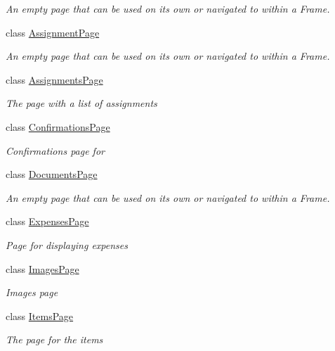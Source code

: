\begin{DoxyCompactItemize}
\begin{DoxyCompactList}\small\item\em An empty page that can be used on its own or navigated to within a Frame. \end{DoxyCompactList}\item 
class \hyperlink{class_field_service_1_1_win_r_t_1_1_views_1_1_assignment_page}{Assignment\+Page}
\begin{DoxyCompactList}\small\item\em An empty page that can be used on its own or navigated to within a Frame. \end{DoxyCompactList}\item 
class \hyperlink{class_field_service_1_1_win_r_t_1_1_views_1_1_assignments_page}{Assignments\+Page}
\begin{DoxyCompactList}\small\item\em The page with a list of assignments \end{DoxyCompactList}\item 
class \hyperlink{class_field_service_1_1_win_r_t_1_1_views_1_1_confirmations_page}{Confirmations\+Page}
\begin{DoxyCompactList}\small\item\em Confirmations page for \end{DoxyCompactList}\item 
class \hyperlink{class_field_service_1_1_win_r_t_1_1_views_1_1_documents_page}{Documents\+Page}
\begin{DoxyCompactList}\small\item\em An empty page that can be used on its own or navigated to within a Frame. \end{DoxyCompactList}\item 
class \hyperlink{class_field_service_1_1_win_r_t_1_1_views_1_1_expenses_page}{Expenses\+Page}
\begin{DoxyCompactList}\small\item\em Page for displaying expenses \end{DoxyCompactList}\item 
class \hyperlink{class_field_service_1_1_win_r_t_1_1_views_1_1_images_page}{Images\+Page}
\begin{DoxyCompactList}\small\item\em Images page \end{DoxyCompactList}\item 
class \hyperlink{class_field_service_1_1_win_r_t_1_1_views_1_1_items_page}{Items\+Page}
\begin{DoxyCompactList}\small\item\em The page for the items \end{DoxyCompactList}\item 

\end{DoxyCompactItemize}
